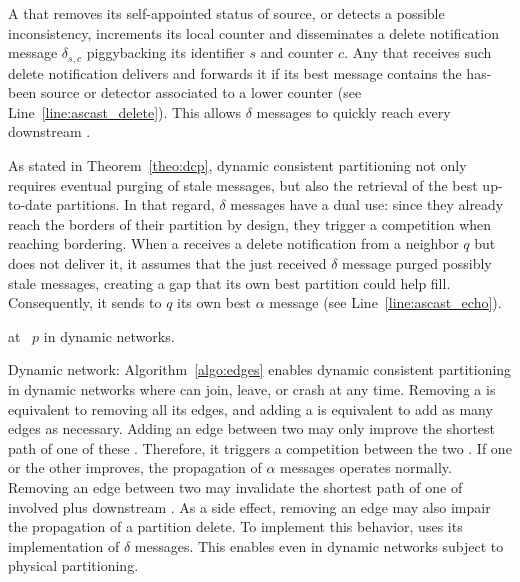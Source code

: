 A \process that removes its self-appointed status of source, or
detects a possible inconsistency, increments its local counter and
disseminates a delete notification message $\delta_{s, c}$
piggybacking its identifier $s$ and counter $c$. Any \process that
receives such delete notification delivers and forwards it if its best
message contains the has-been source or detector associated to a lower
counter (see Line~\ref{line:ascast_delete}). This allows $\delta$
messages to quickly reach every downstream \process.

As stated in Theorem~\ref{theo:dcp}, dynamic consistent partitioning
not only requires eventual purging of stale messages, but also the
retrieval of the best up-to-date partitions.  In that regard, $\delta$
messages have a dual use: since they already reach the borders of
their partition by design, they trigger a competition when reaching
bordering.  When a \process receives a delete notification from a
neighbor $q$ but does not deliver it, it assumes that the just
received $\delta$ message purged possibly stale messages, creating a
gap that its own best partition could help fill. Consequently, it
sends to $q$ its own best $\alpha$ message (see
Line~\ref{line:ascast_echo}).

\begin{algorithm}
  
  \caption{\label{algo:edges}\NAME at \Process~$p$ in dynamic networks.}
\end{algorithm}

\begin{asparadesc}
\item [Dynamic network:] Algorithm~\ref{algo:edges} enables dynamic
  consistent partitioning in dynamic networks where \processes can
  join, leave, or crash at any time. Removing a \process is equivalent
  to removing all its edges, and adding a \process is equivalent to
  add as many edges as necessary.  Adding an edge between two
  \processes may only improve the shortest path of one of these
  \processes. Therefore, it triggers a competition between the two
  \processes. If one or the other \process improves, the propagation
  of $\alpha$ messages operates normally.  Removing an edge between
  two \processes may invalidate the shortest path of one of involved
  \processes plus downstream \processes. As a side effect, removing an
  edge may also impair the propagation of a partition delete. To
  implement this behavior, \NAME uses its implementation of $\delta$
  messages. This enables \NAME even in dynamic networks subject to
  physical partitioning.
\end{asparadesc}

